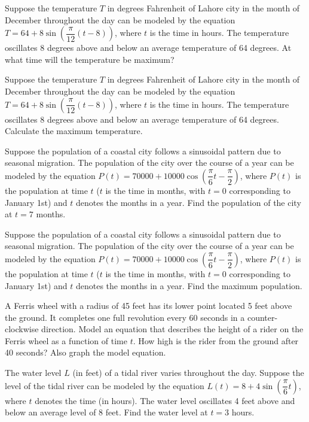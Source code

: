 \documentclass[11pt,a4paper]{article}
\begin{document}
\begin{longlist}
\item Suppose the temperature $T$ in degrees Fahrenheit of Lahore city in the month of December throughout the day can be modeled by the equation $T = 64+8\sin\left(\dfrac{\pi}{12}(t-8)\right)$, where $t$ is the time in hours. The temperature oscillates 8 degrees above and below an average temperature of 64 degrees. At what time will the temperature be maximum?

\item Suppose the temperature $T$ in degrees Fahrenheit of Lahore city in the month of December throughout the day can be modeled by the equation $T = 64+8\sin\left(\dfrac{\pi}{12}(t-8)\right)$, where $t$ is the time in hours. The temperature oscillates 8 degrees above and below an average temperature of 64 degrees. Calculate the maximum temperature.

\item Suppose the population of a coastal city follows a sinusoidal pattern due to seasonal migration. The population of the city over the course of a year can be modeled by the equation $P(t) = 70000 +10000\cos\left(\dfrac{\pi}{6}t-\dfrac{\pi}{2}\right)$, where $P(t)$ is the population at time $t$ ($t$ is the time in months, with $t=0$ corresponding to January 1st) and $t$ denotes the months in a year. Find the population of the city at $t=7$ months.

\item Suppose the population of a coastal city follows a sinusoidal pattern due to seasonal migration. The population of the city over the course of a year can be modeled by the equation $P(t) = 70000 +10000\cos\left(\dfrac{\pi}{6}t-\dfrac{\pi}{2}\right)$, where $P(t)$ is the population at time $t$ ($t$ is the time in months, with $t=0$ corresponding to January 1st) and $t$ denotes the months in a year. Find the maximum population.

\item A Ferris wheel with a radius of 45 feet has its lower point located 5 feet above the ground. It completes one full revolution every 60 seconds in a counter-clockwise direction. Model an equation that describes the height of a rider on the Ferris wheel as a function of time $t$. How high is the rider from the ground after 40 seconds? Also graph the model equation.

\item The water level $L$ (in feet) of a tidal river varies throughout the day. Suppose the level of the tidal river can be modeled by the equation $L(t) = 8+4\sin\left(\dfrac{\pi}{6}t\right)$, where $t$ denotes the time (in hours). The water level oscillates 4 feet above and below an average level of 8 feet. Find the water level at $t=3$ hours.


\end{longlist}
\end{document}
